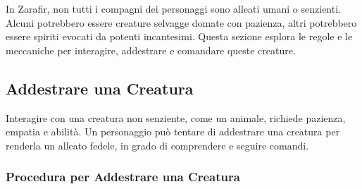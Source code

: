 \documentclass[../manuale_main.tex]{subfiles}
\begin{document}
In Zarafir, non tutti i compagni dei personaggi sono alleati umani o senzienti. Alcuni potrebbero essere creature selvagge domate con pazienza, altri potrebbero essere spiriti evocati da potenti incantesimi. Questa sezione esplora le regole e le meccaniche per interagire, addestrare e comandare queste creature.

\subsection*{Addestrare una Creatura}

Interagire con una creatura non senziente, come un animale, richiede pazienza, empatia e abilità. Un personaggio può tentare di addestrare una creatura per renderla un alleato fedele, in grado di comprendere e seguire comandi.

\subsubsection{Procedura per Addestrare una Creatura}
\end{document}

